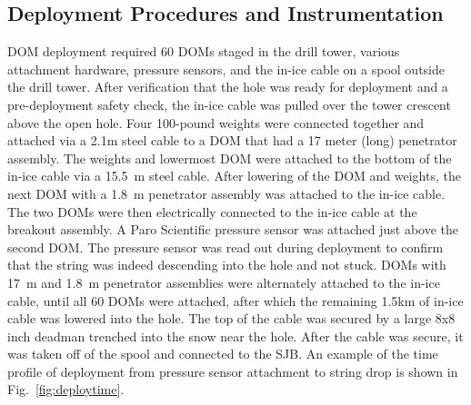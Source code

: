 
\subsection{\label{sec:deployment_inst}Deployment Procedures and Instrumentation}

DOM deployment required 60 DOMs staged in the drill tower, various
attachment hardware, pressure sensors, and the in-ice cable on a spool
outside the drill tower. After verification that the hole was 
ready for deployment and a pre-deployment safety check, the in-ice cable
was pulled over the tower crescent above the open hole. Four 100-pound
weights were connected together and attached via a 2.1m steel cable to a
DOM that had a 17 meter (long) penetrator assembly. The weights and
lowermost DOM were attached to the bottom of the in-ice cable via a 15.5~m
steel cable. After lowering of the DOM and weights, the next DOM with a
1.8~m penetrator assembly was attached to the in-ice cable. The two DOMs were
then electrically connected to the in-ice cable at the breakout assembly. A
Paro Scientific pressure sensor was attached just above the second DOM. The
pressure sensor was read out during deployment to confirm that the string
was indeed descending into the hole and not stuck.   DOMs with 17~m and
1.8~m penetrator assemblies were alternately attached to the in-ice 
cable, until all 60 DOMs were attached, after which the remaining 1.5km of
in-ice cable was lowered into the hole. The top of the cable was secured by
a large 8x8 inch deadman trenched into the snow near the hole. After the
cable was secure, it was taken off of the spool and connected to the
SJB. An example of the time profile of deployment from pressure sensor
attachment to string drop is shown in Fig.~\ref{fig:deploytime}.

